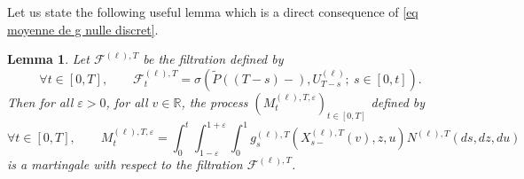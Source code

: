 \documentclass[11pt]{article}
\newtheorem{lemma}[theorem]{Lemma}
\numberwithin{equation}{section}
\def\vp{\varepsilon}
\def \R{\mathbb {R}}
\begin{document}
Let us state the following useful lemma which is a direct consequence of \eqref{eq moyenne de g nulle discret}.

\begin{lemma}\label{lemme martingale}
	Let $\mathcal{F}^{(\ell),T}$ be the filtration defined by
	$$
	\forall t \in [0,T], \qquad
	\mathcal{F}^{(\ell),T}_t
	= \sigma\left(
	\widetilde{P}((T-s)-), U_{T-s}^{(\ell)}; \ s \in [0,t]
	\right).
	$$
	Then for all $\vp>0$, for all $v\in \R$, the process $(M^{(\ell),T,\vp}_t)_{t \in [0,T]}$ defined by
	$$
	\forall t \in [0,T],\qquad
	M^{(\ell),T,\vp}_t
	=\int_0^t\int_{1-\vp}^{1+\vp} \int_0^1 g_s^{(\ell),T} ( X^{(\ell),T}_{s-}(v),z,u) N^{(\ell),T}(ds,dz,du)
	$$
	is a martingale with respect to the filtration $\mathcal{F}^{(\ell),T}$.
\end{lemma}
\end{document}
